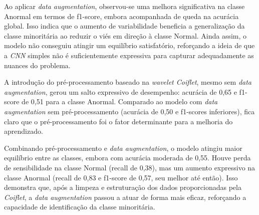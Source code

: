 Ao aplicar \textit{data augmentation}, observou-se uma melhora significativa na classe Anormal em termos de f1-score, embora acompanhada de queda na acurácia global. Isso indica que o aumento de variabilidade beneficia a generalização da classe minoritária ao reduzir o viés em direção à classe Normal. Ainda assim, o modelo não conseguiu atingir um equilíbrio satisfatório, reforçando a ideia de que a \textit{CNN} simples não é suficientemente expressiva para capturar adequadamente as nuances do problema.

A introdução do pré-processamento baseado na \textit{wavelet Coiflet}, mesmo sem \textit{data augmentation}, gerou um salto expressivo de desempenho: acurácia de 0{,}65 e f1-score de 0{,}51 para a classe Anormal. Comparado ao modelo com \textit{data augmentation} sem pré-processamento (acurácia de 0{,}50 e f1-scores inferiores), fica claro que o pré-processamento foi o fator determinante para a melhoria do aprendizado.

Combinando pré-processamento e \textit{data augmentation}, o modelo atingiu maior equilíbrio entre as classes, embora com acurácia moderada de 0{,}55. Houve perda de sensibilidade na classe Normal (recall de 0{,}38), mas um aumento expressivo na classe Anormal (recall de 0{,}83 e f1-score de 0{,}57, seu melhor até então). Isso demonstra que, após a limpeza e estruturação dos dados proporcionadas pela \textit{Coiflet}, a \textit{data augmentation} passou a atuar de forma mais eficaz, reforçando a capacidade de identificação da classe minoritária.

\begin{table}[!h]
\centering
\caption{Resultados da CNN Simples sob diferentes configurações}
\label{tab:cnn_simples}
\fonteproprioautor
\end{table}


